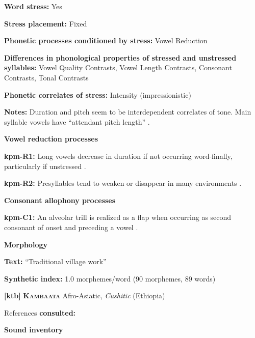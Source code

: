\textbf{Word stress:} Yes



\textbf{Stress placement:} Fixed



\textbf{Phonetic processes conditioned by stress:} Vowel Reduction



\textbf{Differences in phonological properties of stressed and unstressed syllables:} Vowel Quality Contrasts, Vowel Length Contrasts, Consonant Contrasts, Tonal Contrasts



\textbf{Phonetic correlates of stress:} Intensity (impressionistic)



\textbf{Notes:} Duration and pitch seem to be interdependent correlates of tone. Main syllable vowels have “attendant pitch length” \citep[32]{Olsen2014}.



\textbf{Vowel reduction processes}



\textbf{kpm-R1:}  Long vowels decrease in duration if not occurring word-finally, particularly if unstressed \citep[33]{Olsen2014}.



\textbf{kpm-R2:} Presyllables tend to weaken or disappear in many environments \citep[31]{Olsen2014}.



\textbf{Consonant allophony processes}



\textbf{kpm-C1:} An alveolar trill is realized as a flap when occurring as second consonant of onset and preceding a vowel \citep[24]{Olsen2014}.



\textbf{Morphology}



\textbf{Text:} “Traditional village work” \citep[106-107]{Olsen2014}



\textbf{Synthetic index:} 1.0 morphemes/word (90 morphemes, 89 words)



\textbf{[ktb]}   \textbf{\textsc{Kambaata}}  Afro-Asiatic, \textit{Cushitic} (Ethiopia)



References \textbf{consulted:} \citet{Treis2008}



\textbf{Sound inventory}



